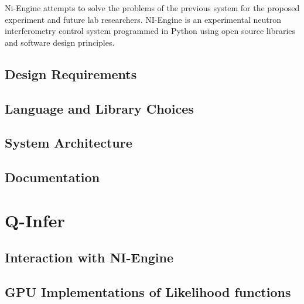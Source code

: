 Ni-Engine attempts to solve the problems of the previous system for the proposed experiment and future lab researchers. NI-Engine is an experimental neutron interferometry control system programmed in Python using open source libraries and software design principles. 
\subsection{Design Requirements}
\subsection{Language and Library Choices}
\subsection{System Architecture}
\subsection{Documentation}
\section{Q-Infer}
\subsection{Interaction with NI-Engine}
\subsection{GPU Implementations of Likelihood functions}

